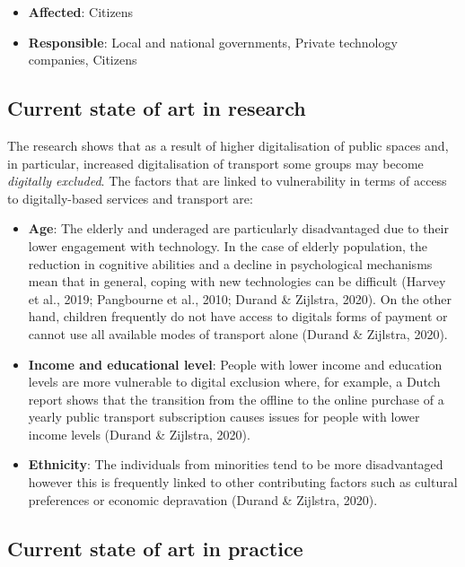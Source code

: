 \documentclass[
]{book}
\providecommand{\tightlist}{%
  \setlength{\itemsep}{0pt}\setlength{\parskip}{0pt}}
\begin{document}
\begin{itemize}
\tightlist
\item
  \textbf{Affected}: Citizens
\item
  \textbf{Responsible}: Local and national governments, Private technology companies, Citizens
\end{itemize}

\hypertarget{current-state-of-art-in-research-3}{%
\subsection*{Current state of art in research}\label{current-state-of-art-in-research-3}}

The research shows that as a result of higher digitalisation of public spaces and, in particular, increased digitalisation of transport some groups may become \emph{digitally excluded}. The factors that are linked to vulnerability in terms of access to digitally-based services and transport are:

\begin{itemize}
\tightlist
\item
  \textbf{Age}: The elderly and underaged are particularly disadvantaged due to their lower engagement with technology. In the case of elderly population, the reduction in cognitive abilities and a decline in psychological mechanisms mean that in general, coping with new technologies can be difficult (Harvey et al., 2019; Pangbourne et al., 2010; Durand \& Zijlstra, 2020). On the other hand, children frequently do not have access to digitals forms of payment or cannot use all available modes of transport alone (Durand \& Zijlstra, 2020).
\item
  \textbf{Income and educational level}: People with lower income and education levels are more vulnerable to digital exclusion where, for example, a Dutch report shows that the transition from the offline to the online purchase of a yearly public transport subscription causes issues for people with lower income levels (Durand \& Zijlstra, 2020).
\item
  \textbf{Ethnicity}: The individuals from minorities tend to be more disadvantaged however this is frequently linked to other contributing factors such as cultural preferences or economic depravation (Durand \& Zijlstra, 2020).
\end{itemize}

\hypertarget{current-state-of-art-in-practice-3}{%
\subsection*{Current state of art in practice}\label{current-state-of-art-in-practice-3}}
\end{document}
